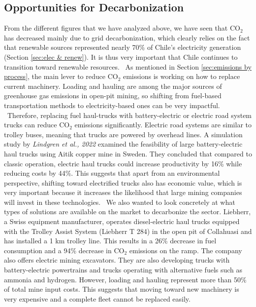\subsection{Opportunities for Decarbonization}
\label{sec:opportunities}
From the different figures that we have analyzed above, we have seen that CO$_2$ has decreased mainly due to grid decarbonization, which clearly relies on the fact that renewable sources represented nearly 70\% of Chile's electricity generation (Section \ref{sec:elec & renew}). It is thus very important that Chile continues to transition toward renewable resources.
\
As mentioned in Section \ref{sec:emissions by process}, the main lever to reduce CO$_2$ emissions is working on how to replace current machinery. Loading and hauling are among the major sources of greenhouse gas emissions in open-pit mining, so shifting from fuel-based transportation methods to electricity-based ones can be very impactful.
\
Therefore, replacing fuel haul-trucks with battery-electric or electric road system trucks can reduce CO$_2$ emissions significantly. Electric road systems are similar to trolley buses, meaning that trucks are powered by overhead lines. A simulation study by \textit{Lindgren et al., 2022} examined the feasibility of large battery-electric haul trucks using Aitik copper mine in Sweden. They concluded that compared to classic operation, electric haul trucks could increase productivity by 16\% while reducing costs by 44\%. \cite{Simulations_of_Battery_Electric} This suggests that apart from an environmental perspective, shifting toward electrified trucks also has economic value, which is very important because it increases the likelihood that large mining companies will invest in these technologies.
\
We also wanted to look concretely at what types of solutions are available on the market to decarbonize the sector. Liebherr, a Swiss equipment manufacturer, operates diesel-electric haul trucks equipped with the Trolley Assist System (Liebherr T 284) in the open pit of Collahuasi and has installed a 1 km trolley line. This results in a 26\% decrease in fuel consumption and a 94\% decrease in CO$_2$ emissions on the ramp. The company also offers electric mining excavators. They are also developing trucks with battery-electric powertrains and trucks operating with alternative fuels such as ammonia and hydrogen.\cite{Liebherr} However, loading and hauling represent more than 50\% of total mine input costs. This suggests that moving toward new machinery is very expensive and a complete fleet cannot be replaced easily.\cite{Mining_fleet_management}